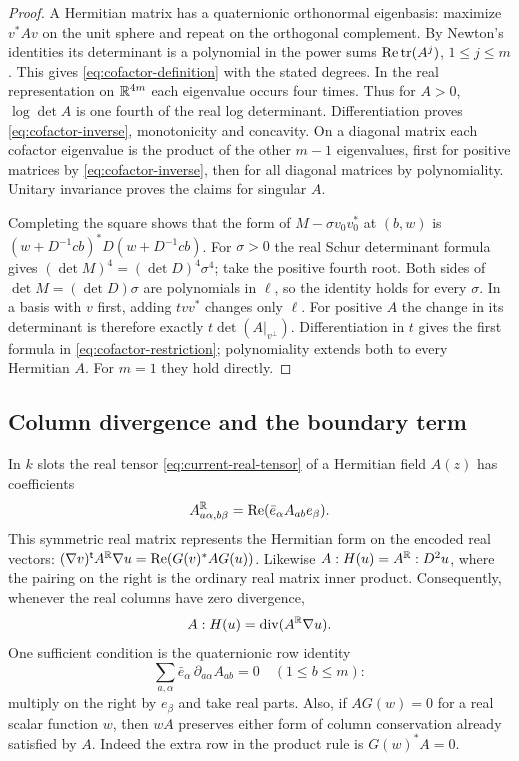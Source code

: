 \begin{proof}
A Hermitian matrix has a quaternionic orthonormal eigenbasis:
maximize $v^*Av$ on the unit sphere and repeat on the orthogonal
complement. By Newton's identities its determinant is a polynomial
in the power sums $\operatorname{Re}\operatorname{tr}(A^j)$, $1\le j\le m$. This gives
\eqref{eq:cofactor-definition} with the stated degrees.
In the real representation on $\mathbb R^{4m}$ each eigenvalue occurs
four times. Thus for $A>0$, $\log\det A$ is one fourth of the real
log determinant. Differentiation proves \eqref{eq:cofactor-inverse},
monotonicity and concavity. On a diagonal matrix each cofactor
eigenvalue is the product of the other $m-1$ eigenvalues, first for
positive matrices by \eqref{eq:cofactor-inverse}, then for all
diagonal matrices by polynomiality. Unitary invariance proves the
claims for singular $A$.

Completing the square shows that the form of $M-\sigma v_0v_0^*$ at
$(b,w)$ is $(w+D^{-1}cb)^*D(w+D^{-1}cb)$. For $\sigma>0$ the real
Schur determinant formula gives $(\det M)^4=(\det D)^4\sigma^4$;
take the positive fourth root. Both sides of $\det M=(\det D)\sigma$
are polynomials in $\ell$, so the identity holds for every $\sigma$.
In a basis with $v$ first, adding $tvv^*$ changes only $\ell$.
For positive $A$ the change in its determinant is therefore exactly
$t\det(A|_{v^\perp})$. Differentiation in $t$ gives the first formula
in \eqref{eq:cofactor-restriction}; polynomiality extends both to
every Hermitian $A$. For $m=1$ they hold directly.
\end{proof}

\subsection{Column divergence and the boundary term}

In $k$ slots the real tensor \eqref{eq:current-real-tensor} of a
Hermitian field $A(z)$ has coefficients
\begin{equation}\label{eq:real-coefficients}
     A^{\mathbb R}_{a\alpha,b\beta}=\operatorname{Re}(\bar e_\alpha A_{ab}e_\beta).
\end{equation}
This symmetric real matrix represents the Hermitian form on the
encoded real vectors: $(\nabla v)^{\mathsf t} A^{\mathbb R}\nabla u=
\operatorname{Re}(G(v)^*A G(u))$. Likewise $A:H(u)=A^{\mathbb R}:D^2u$, where the
pairing on the right is the ordinary real matrix inner product.
Consequently, whenever the real columns have zero divergence,
\begin{equation}\label{eq:real-divergence}
    A:H(u)=\operatorname{div}(A^{\mathbb R}\nabla u).
\end{equation}
One sufficient condition is the quaternionic row identity
\begin{equation}\label{eq:strong-divergence}
     \sum_{a,\alpha}\bar e_\alpha\,\partial_{a\alpha}A_{ab}=0
           \quad(1\le b\le m):
\end{equation}
multiply on the right by $e_\beta$ and take real parts. Also,
if $A G(w)=0$ for a real scalar function $w$, then $wA$ preserves
either form of column conservation already satisfied by $A$.
Indeed the extra row in the product rule is $G(w)^*A=0$.

